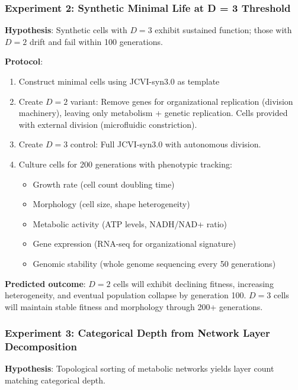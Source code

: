 \documentclass[11pt]{article}
\begin{document}
\subsubsection{Experiment 2: Synthetic Minimal Life at D = 3 Threshold}

\textbf{Hypothesis}: Synthetic cells with $D = 3$ exhibit sustained function; those with $D = 2$ drift and fail within 100 generations.

\textbf{Protocol}:
\begin{enumerate}
\item Construct minimal cells using JCVI-syn3.0 as template
\item Create $D = 2$ variant: Remove genes for organizational replication (division machinery), leaving only metabolism + genetic replication. Cells provided with external division (microfluidic constriction).
\item Create $D = 3$ control: Full JCVI-syn3.0 with autonomous division.
\item Culture cells for 200 generations with phenotypic tracking:
\begin{itemize}
\item Growth rate (cell count doubling time)
\item Morphology (cell size, shape heterogeneity)
\item Metabolic activity (ATP levels, NADH/NAD+ ratio)
\item Gene expression (RNA-seq for organizational signature)
\item Genomic stability (whole genome sequencing every 50 generations)
\end{itemize}
\end{enumerate}

\textbf{Predicted outcome}: $D = 2$ cells will exhibit declining fitness, increasing heterogeneity, and eventual population collapse by generation 100. $D = 3$ cells will maintain stable fitness and morphology through 200+ generations.

\subsubsection{Experiment 3: Categorical Depth from Network Layer Decomposition}

\textbf{Hypothesis}: Topological sorting of metabolic networks yields layer count matching categorical depth.
\end{document}

